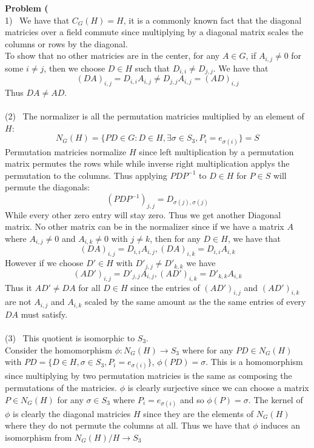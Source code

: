 \documentclass[12pt]{article}
\newenvironment{ques}[1]{\textbf{Problem #1}\vspace{1 mm}\\ }{\bigskip}
\theoremstyle{definition}
\begin{document}
\begin{ques}{1.2}
	(1) \ We have that $C_G(H) = H$, it is a commonly known fact that the
	diagonal matricies over a field commute since multiplying by a diagonal matrix
	scales the columns or rows by the diagonal.\\
	To show that no other matricies are in the center, for any $A \in G$,
	if $A_{i,j} \neq 0$ for some $i \neq j$, then we choose $D \in H$ such that
	$D_{i,i} \neq D_{j,j}$. We have that
	$$(DA)_{i,j} = D_{i,i}A_{i,j} \neq D_{j,j}A_{i,j} = (AD)_{i,j}$$
	Thus $DA \neq AD$. \\
	\\
	(2) \ The normalizer is all the permutation matricies multiplied by an
	element of $H$: 
	$$N_G(H) = \{PD \in G: D \in H, \exists \sigma \in S_3, P_i =
	e_{\sigma(i)}\} = S$$
	Permutation matricies normalize $H$ since left multiplication by a
	permutation matrix permutes the rows while while inverse right
	multiplication applys the permutation to the columns. Thus applying
	$PDP^{-1}$ to $D \in H$ for $P \in S$ will permute the diagonals:
	$$(PDP^{-1})_{j,j} = D_{\sigma(j), \sigma(j)}$$
	While every other zero entry will stay zero. Thus we get another Diagonal
	matrix. No other matrix can be in the normalizer since if we have a matrix
	$A$ where $A_{i,j} \neq 0$ and $A_{i, k} \neq 0$ with $j \neq k$, then for
	any $D \in H$, we have that 
	$$(DA)_{i,j} = D_{i,i}A_{i,j}, (DA)_{i,k} = D_{i,i}A_{i,k}$$
	However if we choose $D' \in H$ with $D'_{j,j} \neq D'_{k,k}$ we have
	$$(AD')_{i,j} = D'_{j,j}A_{i,j}, (AD')_{i,k} = D'_{k,k}A_{i,k}$$
	Thus it $AD' \neq DA$ for all $D \in H$ since the entries of $(AD')_{i,j}$
	and $(AD')_{i,k}$ are not $A_{i,j}$ and $A_{i,k}$ scaled by the same amount
	as the the same entries of every $DA$ must satisfy.\\
	\\
	(3) \ This quotient is isomorphic to $S_3$.\\
	Consider the homomorphism $\phi : N_G(H) \to S_3$ where for any $PD \in
	N_G(H)$ with $PD = \{D \in H, \sigma \in S_3, P_i = e_{\sigma(i)}\}$,
	$\phi(PD) = \sigma$. This is a homomorphism since multiplying by two
	permutation matricies is the same as composing the permutations of the
	matricies. $\phi$ is clearly surjective since we can choose a matrix $P \in
	N_G(H)$ for any $\sigma \in S_3$ where $P_i = e_{\sigma(i)}$ and so
	$\phi(P) = \sigma$. The kernel of $\phi$ is clearly the diagonal matricies
	$H$ since they are the elements of $N_G(H)$ where they do not permute the
	columns at all. Thus we have that $\phi$ induces an isomorphism from
	$N_G(H)/H \to S_3$

\end{ques}
\end{document}
